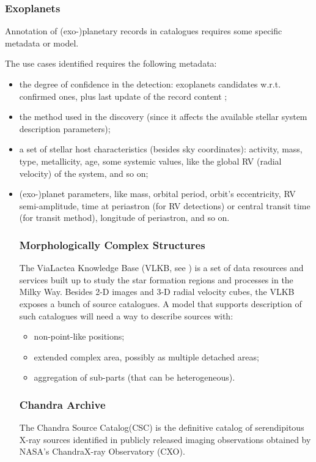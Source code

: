 \documentclass[11pt,a4paper]{ivoa}
\begin{document}
\subsubsection{Exoplanets}
Annotation of (exo-)planetary records in catalogues requires some
specific metadata or model.

The use cases identified requires the following metadata:
\begin{itemize}
	\item the degree of confidence in the detection: exoplanets candidates
w.r.t. confirmed ones, plus last update of the record content ;
	\item the method used in the discovery (since it affects the available
stellar system description parameters);
	\item a set of stellar host characteristics (besides sky coordinates):
activity, mass, type,
metallicity, age, some systemic values, like the global RV (radial
velocity) of the system, and so on;
	\item (exo-)planet parameters, like mass, orbital period, orbit's
eccentricity, RV semi-amplitude, time at periastron (for RV detections)
or central transit time (for transit method), longitude of periastron,
and so on.


\subsubsection{Morphologically Complex Structures}
The ViaLactea Knowledge Base (VLKB, see \cite{2016SPIE.9913E..0HM}) is a set of data
resources and services built up to study the star formation regions and
processes in the Milky Way. Besides 2-D images and 3-D radial velocity
cubes, the VLKB exposes a bunch of source catalogues.
A model that supports description of such catalogues will need a
way to describe sources with:
\begin{itemize}
	\item non-point-like positions;
	\item extended complex area, possibly as multiple detached areas;
	\item aggregation of sub-parts (that can be heterogeneous).
\end{itemize}


\subsubsection{Chandra Archive}
The Chandra Source Catalog(CSC) is the definitive catalog of serendipitous X-ray sources identified in
publicly released imaging observations obtained by NASA’s ChandraX-ray Observatory (CXO).


\end{itemize}
\end{document}
